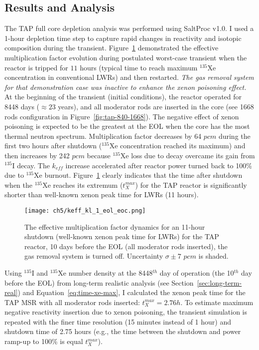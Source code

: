 \subsection{Results and Analysis}
The \gls{TAP} full core depletion analysis was performed using SaltProc v1.0. 
I used a 1-hour depletion time step to capture rapid changes in reactivity and 
isotopic composition during the transient. 
Figure~\ref{fig:lf-tap-keff-eol-eoc-no} demonstrated the effective 
multiplication factor evolution during postulated worst-case transient when 
the reactor is tripped for $11$ hours (typical time to reach maximum 
$^{135}$Xe concentration in conventional \glspl{LWR}) and then restarted. 
\emph{The gas removal system for that demonstration case was inactive to 
enhance the xenon poisoning effect.} At the beginning of the transient 
(initial conditions), the reactor operated for 8448 days ($\approx23$ years), 
and all moderator rods are inserted in the core (see 1668 rods configuration 
in Figure~\ref{fig:tap-840-1668}). The negative effect of xenon poisoning is 
expected to be the greatest at the \gls{EOL} when the core has the most 
thermal neutron spectrum. 
Multiplication factor decreases by 64 $pcm$ during the first two hours after 
shutdown ($^{135}$Xe concentration reached its maximum) and then increases by 
242 $pcm$ because $^{135}$Xe loss due to decay overcame its gain from 
$^{135}$I decay. The $k_{eff}$ increase accelerated after reactor power turned 
back to 100\% due to $^{135}$Xe burnout. 
Figure~\ref{fig:lf-tap-keff-eol-eoc-no} clearly indicates that the time after 
shutdown when the $^{135}$Xe reaches its extremum ($t^{max}_X$) for the 
\gls{TAP} reactor is significantly shorter than well-known xenon peak time for 
\glspl{LWR} (11 hours).
\begin{figure}[htp!] %
	\centering
	\texttt{[image: ch5/keff\_kl\_1\_eol\_eoc.png]}
	\caption{The effective multiplication factor dynamics for an 11-hour 
		shutdown (well-known xenon peak time for \glspl{LWR}) for the TAP 
		reactor, 
		10 days before the \gls{EOL} (all moderator rods inserted), the gas 
		removal system is turned off. Uncertainty $\sigma\pm7$ $pcm$ is 
		shaded.}
	\label{fig:lf-tap-keff-eol-eoc-no}
\end{figure}

Using $^{135}$I and $^{135}$Xe number density at the 8448$^{th}$ day of 
operation (the 10$^{th}$ day before the \gls{EOL}) from long-term realistic 
analysis 
(see Section~\ref{sec:long-term-real}) and Equation~\ref{eq:time-xe-max}, I 
calculated the xenon peak time for the \gls{TAP} \gls{MSR} with all moderator 
rods inserted: $t^{max}_X=2.76h$. To estimate maximum negative reactivity 
insertion due to xenon poisoning, the transient simulation is repeated with 
the finer time resolution (15 minutes instead of 1 hour) and shutdown time of 
2.75 hours (e.g., the time between the shutdown and power ramp-up to 100\% is 
equal $t^{max}_X$).

